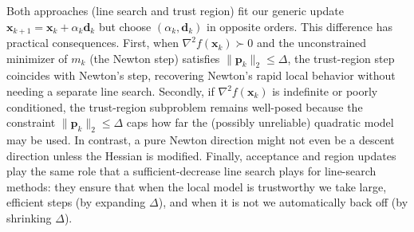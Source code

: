 Both approaches (line search and trust region) fit our generic update $\mathbf{x}_{k+1}=\mathbf{x}_k+\alpha_k\mathbf{d}_k$ but choose $(\alpha_k,\mathbf{d}_k)$ in opposite orders. This difference has practical consequences. First, when $\nabla^{2} f(\mathbf{x}_k)\succ0$ and the unconstrained minimizer of $m_k$ (the Newton step) satisfies $\|\mathbf{p}_k\|_2\le\Delta$, the trust-region step coincides with Newton's step, recovering Newton's rapid local behavior without needing a separate line search. Secondly, if $\nabla^{2} f(\mathbf{x}_k)$ is indefinite or poorly conditioned, the trust-region subproblem remains well-posed because the constraint $\|\mathbf{p}_k\|_2\le\Delta$ caps how far the (possibly unreliable) quadratic model may be used. In contrast, a pure Newton direction might not even be a descent direction unless the Hessian is modified. Finally, acceptance and region updates play the same role that a sufficient-decrease line search plays for line-search methods: they ensure that when the local model is trustworthy we take large, efficient steps (by expanding $\Delta$), and when it is not we automatically back off (by shrinking $\Delta$).



